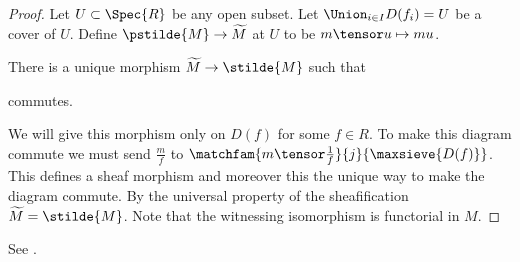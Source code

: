 
\begin{proof}
Let $U\subset \Spec{R}$ be any open subset.
Let $\Union_{i\in I} D(f_i) = U$ be a cover of $U$.
Define $\pstilde{M} \rightarrow \widetilde{M}$
at $U$ to be $m\tensor u \mapsto mu$.

There is a unique morphism $\widetilde{M} \rightarrow \stilde{M}$
such that 
\begin{center}
\end{center}
commutes.

We will give this morphism only on $D(f)$ for some $f\in R$.
To make this diagram commute we must send $\frac{m}{f}$
to $\matchfam{m\tensor \frac{1}{f}}{j}{\maxsieve{D(f)}}$. %
This defines a sheaf morphism and moreover this the unique way to make the diagram commute.
By the universal property of the sheafification $\widetilde{M} = \stilde{M}$.
Note that the witnessing isomorphism is functorial in $M$. 
\end{proof}

See \cite[Tag 01I7]{stacks}.
